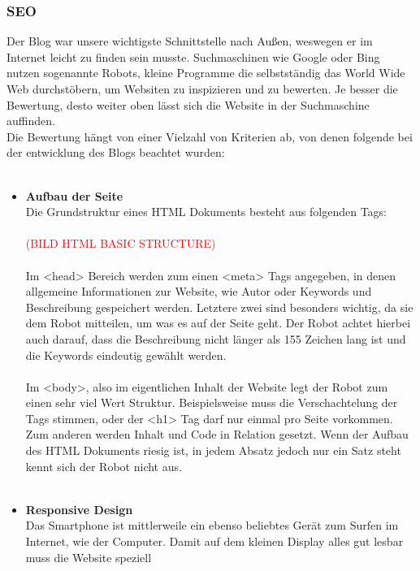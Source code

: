{    \subsubsection{SEO}
    Der Blog war unsere wichtigste Schnittstelle nach Außen, weswegen er im Internet leicht zu finden sein musste. Suchmaschinen wie Google oder Bing nutzen
    sogenannte Robots, kleine Programme die selbstständig das World Wide Web durchstöbern, um Websiten zu inspizieren und zu bewerten. Je besser die Bewertung,
    desto weiter oben lässt sich die Website in der Suchmaschine auffinden.\\
    Die Bewertung hängt von einer Vielzahl von Kriterien ab, von denen folgende bei der entwicklung des Blogs beachtet wurden:\\
    \\
    \begin{itemize}
      \item \textbf{Aufbau der Seite}\\
        Die Grundstruktur eines HTML Dokuments besteht aus folgenden Tags:\\
        \\
        \textcolor{red}{(BILD HTML BASIC STRUCTURE)}\\
        \\
        Im <head> Bereich werden zum einen <meta> Tags angegeben, in denen allgemeine Informationen zur Website, wie Autor oder Keywords und Beschreibung gespeichert werden.
        Letztere zwei sind besonders wichtig, da sie dem Robot mitteilen, um was es auf der Seite geht. Der Robot achtet hierbei auch darauf, dass die Beschreibung nicht
        länger als 155 Zeichen lang ist und die Keywords eindeutig gewählt werden.\\
        \\
        Im <body>, also im eigentlichen Inhalt der Website legt der Robot zum einen sehr viel Wert Struktur. Beispielsweise muss die Verschachtelung der Tags stimmen, oder der <h1> Tag darf nur einmal pro Seite
        vorkommen. Zum anderen werden Inhalt und Code in Relation gesetzt. Wenn der Aufbau des HTML Dokuments riesig ist, in jedem Absatz jedoch nur ein Satz steht kennt sich der Robot nicht aus.\\
        \\
      \item \textbf{Responsive Design}\\
        Das Smartphone ist mittlerweile ein ebenso beliebtes Gerät zum Surfen im Internet, wie der Computer. Damit auf dem kleinen Display alles gut lesbar muss die Website speziell

\end{itemize}}
